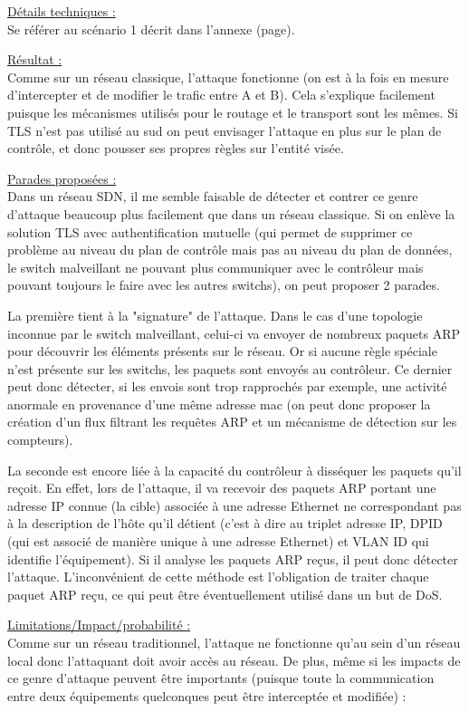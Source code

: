 \underline{Détails techniques :}\\
Se référer au scénario 1 décrit dans l'annexe (page).

\underline{Résultat :}\\
Comme sur un réseau classique, l'attaque fonctionne (on est à la fois en mesure d'intercepter et de modifier le trafic entre A et B). Cela s'explique facilement puisque les mécanismes utilisés pour le routage et le transport sont les mêmes. Si TLS n'est pas utilisé au sud on peut envisager l'attaque en plus sur le plan de contrôle, et donc pousser ses propres règles sur l'entité visée.

\underline{Parades proposées :}\\
Dans un réseau SDN, il me semble faisable de détecter et contrer ce genre d'attaque beaucoup plus facilement que dans un réseau classique. Si on enlève la solution TLS avec authentification mutuelle (qui permet de supprimer ce problème au niveau du plan de contrôle mais pas au niveau du plan de données, le switch malveillant ne pouvant plus communiquer avec le contrôleur mais pouvant toujours le faire avec les autres switchs), on peut proposer 2 parades.

La première tient à la "signature" de l'attaque. Dans le cas d'une topologie inconnue par le switch malveillant, celui-ci va envoyer de nombreux paquets ARP pour découvrir les éléments présents sur le réseau. Or si aucune règle spéciale n'est présente sur les switchs, les paquets sont envoyés au contrôleur. Ce dernier peut donc détecter, si les envois sont trop rapprochés par exemple, une activité anormale en provenance d'une même adresse mac (on peut donc proposer la création d'un flux filtrant les requêtes ARP et un mécanisme de détection sur les compteurs).

La seconde est encore liée à la capacité du contrôleur à disséquer les paquets qu'il reçoit. En effet, lors de l'attaque, il va recevoir des paquets ARP portant une adresse IP connue (la cible) associée à une adresse Ethernet ne correspondant pas à la description de l'hôte qu'il détient (c'est à dire au triplet adresse IP, DPID (qui est associé de manière unique à une adresse Ethernet) et VLAN ID qui identifie l'équipement). Si il analyse les paquets ARP reçus, il peut donc détecter l'attaque. L'inconvénient de cette méthode est l'obligation de traiter chaque paquet ARP reçu, ce qui peut être éventuellement utilisé dans un but de DoS.

\underline{Limitations/Impact/probabilité :}\\
Comme sur un réseau traditionnel, l’attaque ne fonctionne qu’au sein d’un réseau local donc l’attaquant doit avoir accès au réseau. De plus, même si les impacts de ce genre d’attaque peuvent être importants (puisque toute la communication entre deux équipements quelconques peut être interceptée et modifiée) :\\

